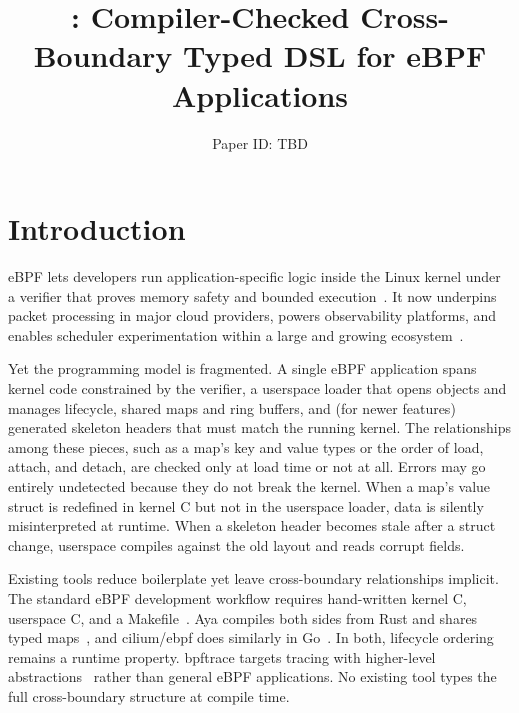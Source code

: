 \documentclass[sigplan,10pt,nonacm]{acmart}
\title{\tool: Compiler-Checked Cross-Boundary Typed DSL for eBPF Applications}
\author{Paper ID: TBD}
\affiliation{%
  \institution{}
  \country{}}
\begin{document}
\maketitle
\pagestyle{plain}

\section{Introduction}

eBPF lets developers run application-specific logic inside the Linux kernel under a verifier that proves memory safety and bounded execution~\cite{linux-ebpf}.
It now underpins packet processing in major cloud providers, powers observability platforms, and enables scheduler experimentation within a large and growing ecosystem~\cite{ebpfsurvey}.

Yet the programming model is fragmented.
A single eBPF application spans kernel code constrained by the verifier, a userspace loader that opens objects and manages lifecycle, shared maps and ring buffers, and (for newer features) generated skeleton headers that must match the running kernel.
The relationships among these pieces, such as a map's key and value types or the order of load, attach, and detach, are checked only at load time or not at all.
Errors may go entirely undetected because they do not break the kernel. When a map's value struct is redefined in kernel C but not in the userspace loader, data is silently misinterpreted at runtime. When a skeleton header becomes stale after a struct change, userspace compiles against the old layout and reads corrupt fields.

Existing tools reduce boilerplate yet leave cross-boundary relationships implicit.
The standard eBPF development workflow requires hand-written kernel C, userspace C, and a Makefile~\cite{libbpf}.
Aya compiles both sides from Rust and shares typed maps~\cite{aya}, and cilium/ebpf does similarly in Go~\cite{cilium-ebpf}.
In both, lifecycle ordering remains a runtime property.
bpftrace targets tracing with higher-level abstractions~\cite{bpftrace} rather than general eBPF applications.
No existing tool types the full cross-boundary structure at compile time.
\end{document}
